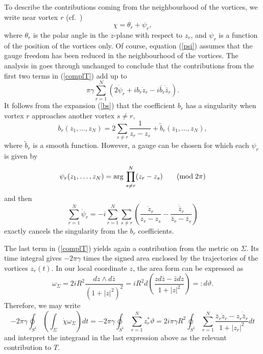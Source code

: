 \documentclass[a4paper,11pt]{article}
\begin{document}
To describe the contributions coming from the neighbourhood of the 
vortices, we write near vortex $r$ (cf.~\cite{Mfovd})
\begin{equation} \label{psi}
\chi=\theta_{r}+\psi_{r}, 
\end{equation}
where $\theta_{r}$ is the polar angle in the $z$-plane with respect to
$z_{r}$, and $\psi_{r}$ is a function of the position of the 
vortices only.
Of course, equation (\ref{psi}) assumes that the gauge freedom has 
been reduced in the neighbourhood of the vortices.
The analysis in \cite{Mfovd} goes through unchanged to conclude that
the contributions from the first two terms in (\ref{complT}) add up to
\begin{equation}\label{cont12}
\pi\gamma\sum_{r=1}^{N}\left(2\dot{\psi}_{r}+ib_{r}\dot{z}_{r}
-i\bar{b}_{r}\dot{\bar{z}}_{r}
\right).
\end{equation}
It follows from the expansion (\ref{bs}) that the coefficient $b_{r}$ 
has a singularity when vortex $r$ approaches another vortex $s\ne r$,
\begin{equation}\label{btil}
b_{r}(z_{1},\ldots,z_{N})=2\sum_{s\ne r}\frac{1}{z_{r}-z_{s}}+
\tilde{b}_{r}(z_{1},\ldots, z_{N}),
\end{equation}
where $\tilde{b}_{r}$ is a smooth function.
However, a gauge can be chosen for which each $\psi_{r}$ is given by
\[
\psi_{r}(z_{1},\ldots,z_{N})={\rm arg}\,\prod_{s\ne r}^{N}(z_{r}-z_{s})
\;\;\;\;\;\;\;({\rm mod}\; 2\pi)
\]
and then
\[
\sum_{r=1}^{N}\dot{\psi}_{r}=-i
\sum_{r=1}^{N}\sum_{s\ne r}\left( \frac{\dot{z}_{r}}{z_{r}-z_{s}}-
\frac{\dot{\bar{z}}_{r}}{\bar{z}_{r}-\bar{z}_{s}}\right)
\]
exactly cancels the singularity from the $b_{r}$ coefficients. 


The last term in (\ref{complT}) yields again a contribution from the
metric on $\Sigma$. Its time integral gives $-2\pi\gamma$ times the 
signed area enclosed by the trajectories of the vortices $z_{r}(t)$. 
In our local coordinate $z$, the area form can be expressed as
\[
\omega_{\Sigma}=2iR^{2}\frac{dz\wedge d\bar{z}}{\left(1+|z|^{2}\right)^{2}}
=iR^{2}d\left(\frac{zd\bar{z}-\bar{z}dz}{1+|z|^{2}}   \right)
=:d\vartheta.
\]
Therefore, we may write
\begin{equation}\label{cont3}
-2\pi\gamma\oint_{S^{1}}\left(\int_{\Sigma}\dot{\chi}\omega_{\Sigma}\right)dt
=-2\pi\gamma \oint_{S^{1}}
\sum_{r=1}^{N}z_{r}^{*}\vartheta=
2i\pi\gamma R^{2}\oint_{S^{1}} \sum_{r=1}^{N}
\frac{\bar{z}_{r}\dot{z}_{r}-z_{r}\dot{\bar{z}}_{r}}{1+|z_{r}|^{2}}dt
\end{equation}
and interpret the integrand in the last expression above as the
relevant contribution to $T$.
\end{document}
